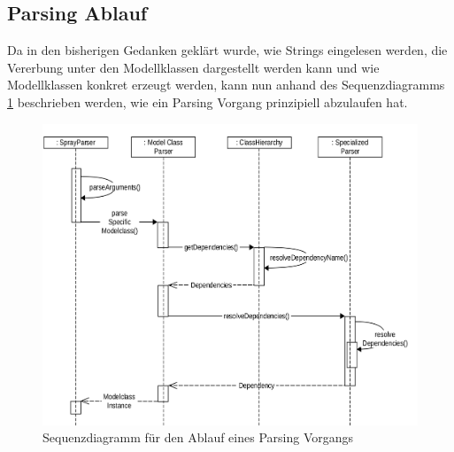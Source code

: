 \subsection{Parsing Ablauf}
Da in den bisherigen Gedanken geklärt wurde, wie Strings eingelesen werden, die Vererbung unter den Modellklassen dargestellt werden kann und wie Modellklassen konkret erzeugt werden, kann nun anhand des Sequenzdiagramms \ref{sequenzdiagrammAnsatz} beschrieben werden, wie ein Parsing Vorgang prinzipiell abzulaufen hat.\linebreak
\begin{figure}[htb]
	\hspace*{-0.5cm}
		\includegraphics[scale = 0.13]{Bilder/sequenzdiagrammAnsatzKomprimiertScaled(2500x2500).png}
		\caption{Sequenzdiagramm für den Ablauf eines Parsing Vorgangs}
		\label{sequenzdiagrammAnsatz}

\end{figure}
